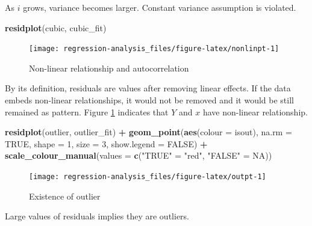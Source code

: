 \documentclass[]{book}
\newenvironment{Shaded}{\begin{snugshade}}{\end{snugshade}}
\newcommand{\DataTypeTok}[1]{\textcolor[rgb]{0.13,0.29,0.53}{#1}}
\newcommand{\DecValTok}[1]{\textcolor[rgb]{0.00,0.00,0.81}{#1}}
\newcommand{\KeywordTok}[1]{\textcolor[rgb]{0.13,0.29,0.53}{\textbf{#1}}}
\newcommand{\NormalTok}[1]{#1}
\newcommand{\OperatorTok}[1]{\textcolor[rgb]{0.81,0.36,0.00}{\textbf{#1}}}
\newcommand{\OtherTok}[1]{\textcolor[rgb]{0.56,0.35,0.01}{#1}}
\newcommand{\StringTok}[1]{\textcolor[rgb]{0.31,0.60,0.02}{#1}}
\theoremstyle{definition}
\theoremstyle{definition}
\theoremstyle{definition}
\theoremstyle{remark}
\begin{document}
As \(i\) grows, variance becomes larger. Constant variance assumption is violated.

\begin{Shaded}
\begin{Highlighting}[]
\KeywordTok{residplot}\NormalTok{(cubic, cubic_fit)}
\end{Highlighting}
\end{Shaded}

\begin{figure}[H]

{\centering \texttt{[image: regression-analysis\_files/figure-latex/nonlinpt-1]} 

}

\caption{Non-linear relationship and autocorrelation}\label{fig:nonlinpt}
\end{figure}

By its definition, residuals are values after removing linear effects. If the data embeds non-linear relationships, it would not be removed and it would be still remained as pattern. Figure \ref{fig:nonlinpt} indicates that \(Y\) and \(x\) have non-linear relationship.

\begin{Shaded}
\begin{Highlighting}[]
\KeywordTok{residplot}\NormalTok{(outlier, outlier_fit) }\OperatorTok{+}
\StringTok{  }\KeywordTok{geom_point}\NormalTok{(}\KeywordTok{aes}\NormalTok{(}\DataTypeTok{colour =}\NormalTok{ isout), }\DataTypeTok{na.rm =} \OtherTok{TRUE}\NormalTok{, }\DataTypeTok{shape =} \DecValTok{1}\NormalTok{, }\DataTypeTok{size =} \DecValTok{3}\NormalTok{, }\DataTypeTok{show.legend =} \OtherTok{FALSE}\NormalTok{) }\OperatorTok{+}
\StringTok{  }\KeywordTok{scale_colour_manual}\NormalTok{(}\DataTypeTok{values =} \KeywordTok{c}\NormalTok{(}\StringTok{"TRUE"}\NormalTok{ =}\StringTok{ "red"}\NormalTok{, }\StringTok{"FALSE"}\NormalTok{ =}\StringTok{ }\OtherTok{NA}\NormalTok{))}
\end{Highlighting}
\end{Shaded}

\begin{figure}[H]

{\centering \texttt{[image: regression-analysis\_files/figure-latex/outpt-1]} 

}

\caption{Existence of outlier}\label{fig:outpt}
\end{figure}

Large values of residuals implies they are outliers.
\end{document}
